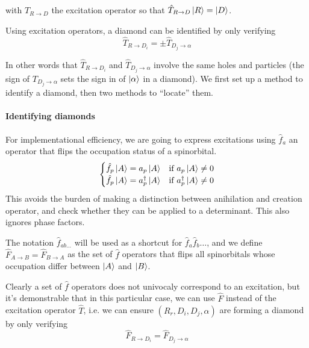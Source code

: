 \documentclass[./thesis.tex]{subfiles}
\begin{document}
with $\hat T_{R \rightarrow D}$ the excitation operator so that $\hat T_{R \rightarrow D} \ket R = \ket D$.



Using excitation operators, a diamond can be identified by only verifying
\begin{equation}
\hat T_{R \rightarrow D_i} = \pm \hat T_{D_j \rightarrow \alpha}
\label{eq:excitation_diamond}
\end{equation}

In other words that $\hat T_{R \rightarrow D_i}$ and $\hat T_{D_j \rightarrow \alpha}$ involve the same holes and particles (the sign of $T_{D_j \rightarrow \alpha}$ sets the sign in of ${\ket{\alpha}}$ in a diamond).
We first set up a method to identify a diamond, then two methods to ``locate'' them.


\paragraph{Identifying diamonds}
For implementational efficiency, we are going to express excitations using $\hat f_a$ an operator that flips the occupation status of a spinorbital.
\begin{align}
  \begin{cases}
  \hat f_p \ket A = a_p \ket A & \text{if }  a_p \ket A \neq 0\\
  \hat f_p \ket A = a^\dagger_p \ket A & \text{if }  a^\dagger_p  \ket A \neq 0\\
  \end{cases}
\end{align}
This avoids the burden of making a distinction between anihilation and creation operator, and check whether they can be applied to a determinant. This also ignores phase factors.


The notation $\hat f_{ab\ldots}$ will be used as a shortcut for $\hat f_a \hat f_b \ldots$, and we define $\hat F_{A \rightarrow B} = \hat F_{B \rightarrow A}$ as the set of $\hat f$ operators that flips all spinorbitals whose occupation differ between $\ket A$ and $\ket B$.

Clearly a set of $\hat f$ operators does not univocaly correspond to an excitation, but it's demonstrable that in this particular case, we can use $\hat F$ instead of the excitation operator $\hat T$, i.e. we can ensure $(R_r, D_i, D_j, \alpha)$ are forming a diamond by only verifying
\begin{equation}
\hat F_{R \rightarrow D_i} = \hat F_{D_j \rightarrow \alpha}
\label{eq:diamond_flip}
\end{equation}
\end{document}

